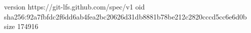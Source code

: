 version https://git-lfs.github.com/spec/v1
oid sha256:92a7fbfdc2f6dd6ab4fea2bc20626d31db8881b78be212c2820cccd5cc6e6d0b
size 174916
